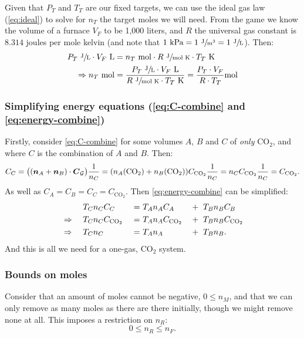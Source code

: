 \documentclass{article}
\newcommand{\CDiox}{\mathrm{CO}_2}
\begin{document}
Given that $P_T$ and $T_T$ are our fixed targets, we can use the ideal gas law (\cref{eq:ideal})
to solve for $n_T$ the target moles we will need. From the game we know the volume of a furnace
$V_F$ to be 1,000 liters, and $R$ the universal gas constant is $8.314$ joules per mole kelvin (and
note that $1\ \text{kPa}=1\ \sfrac{\text{J}}{\text{m}^3}=1\ \sfrac{\text{J}}{\text{L}}$). Then:
\begin{align}
    P_T\ \sfrac{\text{J}}{\text{L}}\cdot V_F\ \text{L}
    &= n_T\ \text{mol}\cdot R\ \sfrac{\text{J}}{\text{mol}\ \text{K}}\cdot T_T\ \text{K} \notag \\
    \Rightarrow
    n_T\ \text{mol}
    &= \frac
        {P_T\ \sfrac{\text{J}}{\text{L}}\cdot V_F\ \text{L}}
        {R\ \sfrac{\text{J}}{\text{mol}\ \text{K}}\cdot T_T\ \text{K}}
    = \frac{P_T\cdot V_F}{R\cdot T_T}\text{mol}
\end{align}

\subsubsection*{Simplifying energy equations (\cref{eq:C-combine} and \cref{eq:energy-combine})}

Firstly, consider \cref{eq:C-combine} for some volumes $A$, $B$ and $C$ of \emph{only} $\CDiox$,
and where $C$ is the combination of $A$ and $B$. Then:
\[
    C_C
    = \big((\vec{n}_A+\vec{n}_B)\cdot\vec{C}_{\calG}\big)\frac{1}{n_C}
    = (n_A(\CDiox)+n_B(\CDiox))C_{\CDiox}\frac{1}{n_C}
    = n_C C_{\CDiox}\frac{1}{n_C}
    = C_{\CDiox}.
\]
As well as $C_A=C_B=C_C=C_{\CDiox}$. Then \cref{eq:energy-combine} can be simplified:
\begin{alignat}{4}
    &\phantom{\Rightarrow} &
    &\ T_C n_C C_C &
    \ = &\ T_A n_A C_A & &+\ T_B n_B C_B \notag \\
    &\Rightarrow &
    &\ T_C n_C C_{\CDiox} &
    \ = &\ T_A n_A C_{\CDiox} & &+\ T_B n_B C_{\CDiox} \notag \\
    &\Rightarrow &
    &\ T_C n_C &
    \ = &\ T_A n_A & &+\ T_B n_B.
    \label{eq:T-combine}
\end{alignat}
And this is all we need for a one-gas, $\CDiox$ system.

\subsubsection*{Bounds on moles}

Consider that an amount of moles cannot be negative, $0\le n_M$, and that we can only remove as many
moles as there are there initially, though we might remove none at all. This imposes a restriction
on $n_R$:
\[
    0 \le n_R \le n_F.
\]
\end{document}
